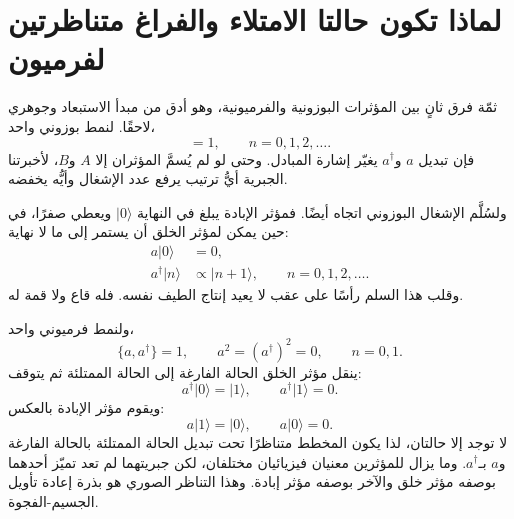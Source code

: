 \section{لماذا تكون حالتا الامتلاء والفراغ متناظرتين لفرميون}

ثمّة فرق ثانٍ بين المؤثرات البوزونية والفرميونية، وهو أدق من مبدأ الاستبعاد وجوهري لاحقًا. لنمط بوزوني واحد،
\begin{equation}
[a,a^\dagger]=1,
\qquad
n=0,1,2,\ldots.
\end{equation}
فإن تبديل \(a\) و\(a^\dagger\) يغيّر إشارة المبادل. وحتى لو لم يُسمَّ المؤثران إلا \(A\) و\(B\)، لأخبرتنا الجبرية أيُّ ترتيب يرفع عدد الإشغال وأيُّه يخفضه.

ولسُلَّم الإشغال البوزوني اتجاه أيضًا. فمؤثر الإبادة يبلغ في النهاية \(\lvert0\rangle\) ويعطي صفرًا، في حين يمكن لمؤثر الخلق أن يستمر إلى ما لا نهاية:
\begin{align}
a\lvert0\rangle&=0,\\
a^\dagger\lvert n\rangle&\propto\lvert n+1\rangle,
\qquad n=0,1,2,\ldots.
\end{align}
وقلب هذا السلم رأسًا على عقب لا يعيد إنتاج الطيف نفسه. فله قاع ولا قمة له.

ولنمط فرميوني واحد،
\begin{equation}
\{a,a^\dagger\}=1,
\qquad
a^2=(a^\dagger)^2=0,
\qquad
n=0,1.
\label{eq:l10-fermion-mode}
\end{equation}
ينقل مؤثر الخلق الحالة الفارغة إلى الحالة الممتلئة ثم يتوقف:
\begin{equation}
a^\dagger\lvert0\rangle=\lvert1\rangle,
\qquad
a^\dagger\lvert1\rangle=0.
\end{equation}
ويقوم مؤثر الإبادة بالعكس:
\begin{equation}
a\lvert1\rangle=\lvert0\rangle,
\qquad
a\lvert0\rangle=0.
\end{equation}
لا توجد إلا حالتان، لذا يكون المخطط متناظرًا تحت تبديل الحالة الممتلئة بالحالة الفارغة و\(a\) بـ\(a^\dagger\). وما يزال للمؤثرين معنيان فيزيائيان مختلفان، لكن جبريتهما لم تعد تميّز أحدهما بوصفه مؤثر خلق والآخر بوصفه مؤثر إبادة. وهذا التناظر الصوري هو بذرة إعادة تأويل الجسيم-الفجوة.

\begin{classroomqa}
\end{classroomqa}

